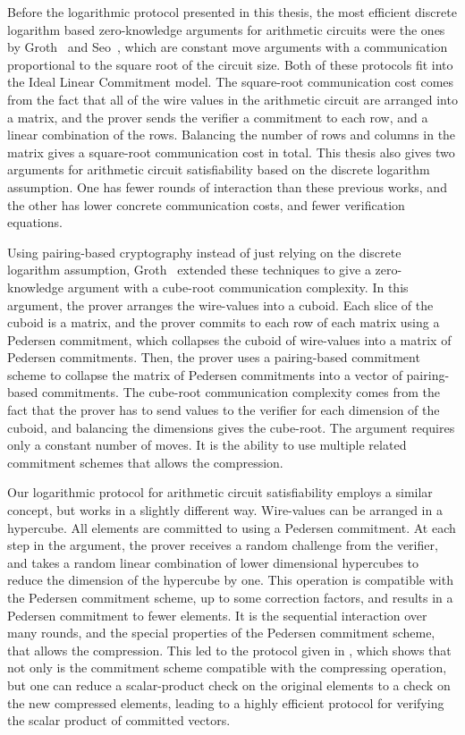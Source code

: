 Before the logarithmic protocol presented in this thesis, the most efficient discrete logarithm based zero-knowledge arguments for arithmetic circuits were the ones by Groth~\cite{Groth2009b} and Seo~\cite{Seo2011a}, which are constant move arguments with a communication proportional to the square root of the circuit size. Both of these protocols fit into the Ideal Linear Commitment model. The square-root communication cost comes from the fact that all of the wire values in the arithmetic circuit are arranged into a matrix, and the prover sends the verifier a commitment to each row, and a linear combination of the rows. Balancing the number of rows and columns in the matrix gives a square-root communication cost in total. This thesis also gives two arguments for arithmetic circuit satisfiability based on the discrete logarithm assumption. One has fewer rounds of interaction than these previous works, and the other has lower concrete communication costs, and fewer verification equations.

Using pairing-based cryptography instead of just relying on the discrete logarithm assumption, Groth~\cite{Groth11} extended these techniques to give a zero-knowledge argument with a cube-root communication complexity. In this argument, the prover arranges the wire-values into a cuboid. Each slice of the cuboid is a matrix, and the prover commits to each row of each matrix using a Pedersen commitment, which collapses the cuboid of wire-values into a matrix of Pedersen commitments. Then, the prover uses a pairing-based commitment scheme to collapse the matrix of Pedersen commitments into a vector of pairing-based commitments. The cube-root communication complexity comes from the fact that the prover has to send values to the verifier for each dimension of the cuboid, and balancing the dimensions gives the cube-root. The argument requires only a constant number of moves. It is the ability to use multiple related commitment schemes that allows the compression.

Our logarithmic protocol for arithmetic circuit satisfiability employs a similar concept, but works in a slightly different way. Wire-values can be arranged in a hypercube. All elements are committed to using a Pedersen commitment. At each step in the argument, the prover receives a random challenge from the verifier, and takes a random linear combination of lower dimensional hypercubes to reduce the dimension of the hypercube by one. This operation is compatible with the Pedersen commitment scheme, up to some correction factors, and results in a Pedersen commitment to fewer elements. It is the sequential interaction over many rounds, and the special properties of the Pedersen commitment scheme, that allows the compression. This led to the protocol given in \cite{BootleCCGP16}, which shows that not only is the commitment scheme compatible with the compressing operation, but one can reduce a scalar-product check on the original elements to a check on the new compressed elements, leading to a highly efficient protocol for verifying the scalar product of committed vectors. 

